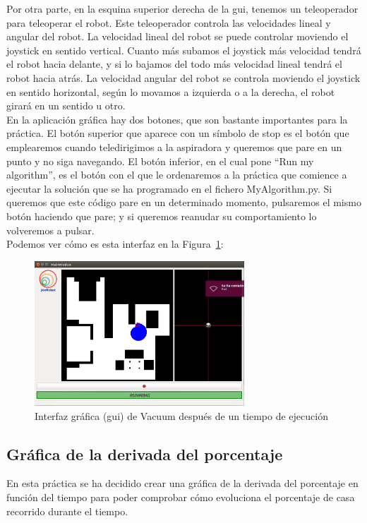 Por otra parte, en la esquina superior derecha de la \acrshort{gui}, tenemos un teleoperador para teleoperar el robot. Este teleoperador controla las velocidades lineal y angular del robot. La velocidad lineal del robot se puede controlar moviendo el joystick en sentido vertical. Cuanto más subamos el joystick más velocidad tendrá el robot hacia delante, y si lo bajamos del todo más velocidad lineal tendrá el robot hacia atrás. La velocidad angular del robot se controla moviendo el joystick en sentido horizontal, según lo movamos a izquierda o a la derecha, el robot girará en un sentido u otro.\\

En la aplicación gráfica hay dos botones, que son bastante importantes para la práctica. El botón superior que aparece con un símbolo de stop es el botón que emplearemos cuando teledirigimos a la aspiradora y queremos que pare en un punto y no siga navegando. El botón inferior, en el cual pone ``Run my algorithm'', es el botón con el que le ordenaremos a la práctica que comience a ejecutar la solución que se ha programado en el fichero MyAlgorithm.py. Si queremos que este código pare en un determinado momento, pulsaremos el mismo botón haciendo que pare; y si queremos reanudar su comportamiento lo volveremos a pulsar.\\

Podemos ver cómo es esta interfaz en la Figura~\ref{fig.GUI2}:

\begin{figure}[H]
  \begin{center}
    \includegraphics[width=0.7\textwidth]{figures/Vacuum/GUI2.png}
		\caption{Interfaz gráfica (\acrshort{gui}) de Vacuum después de un tiempo de ejecución}
		\label{fig.GUI2}
		\end{center}
\end{figure}

\subsection{Gráfica de la derivada del porcentaje}
En esta práctica se ha decidido crear una gráfica de la derivada del porcentaje en función del tiempo para poder comprobar cómo evoluciona el porcentaje de casa recorrido durante el tiempo.\\


